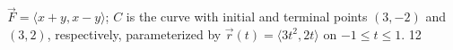 {$\vec F = \langle x+y,x-y\rangle$; $C$ is the curve with initial and terminal points $(3,-2)$ and $(3,2)$, respectively, parameterized by $\vec r(t) = \langle 3t^2,2t\rangle$ on $-1\leq t\leq 1$.
}
{12
}
